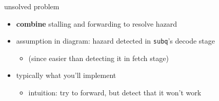 \begin{frame}[fragile,label=loadUse]{unsolved problem}
\begin{itemize}
    \item \textbf{combine} stalling and forwarding to resolve hazard
    \item assumption in diagram: hazard detected in \texttt{subq}'s decode stage
        \begin{itemize}
        \item (since easier than detecting it in fetch stage)
        \end{itemize}
    \item typically what you'll implement
        \begin{itemize}
        \item intuition: try to forward, but detect that it won't work
        \end{itemize}
\end{itemize}
\end{frame}
